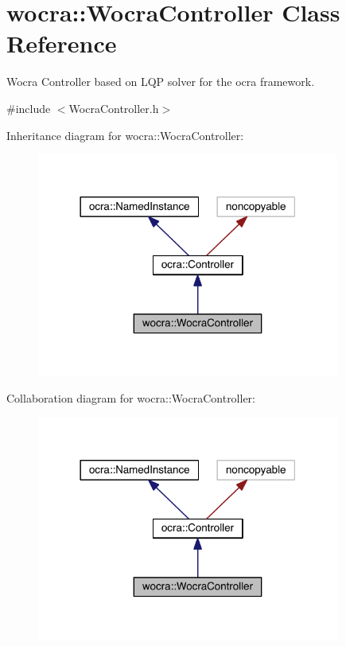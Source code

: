 \hypertarget{classwocra_1_1WocraController}{}\section{wocra\+:\+:Wocra\+Controller Class Reference}
\label{classwocra_1_1WocraController}


Wocra Controller based on L\+QP solver for the ocra framework.  




{\ttfamily \#include $<$Wocra\+Controller.\+h$>$}



Inheritance diagram for wocra\+:\+:Wocra\+Controller\+:\nopagebreak
\begin{figure}[H]
\begin{center}
\leavevmode
\includegraphics[width=282pt]{d9/d5a/classwocra_1_1WocraController__inherit__graph}
\end{center}
\end{figure}


Collaboration diagram for wocra\+:\+:Wocra\+Controller\+:\nopagebreak
\begin{figure}[H]
\begin{center}
\leavevmode
\includegraphics[width=282pt]{df/db8/classwocra_1_1WocraController__coll__graph}
\end{center}
\end{figure}

